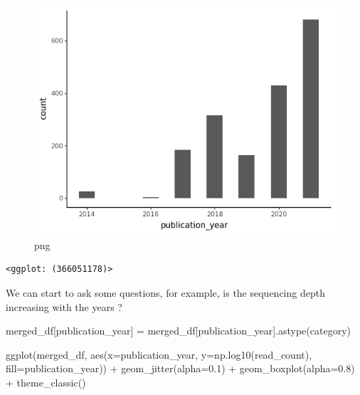 \documentclass[
  letterpaper,
]{book}
\newenvironment{Shaded}{}{}
\newcommand{\FloatTok}[1]{\textcolor[rgb]{0.00,0.36,0.77}{#1}}
\newcommand{\NormalTok}[1]{\textcolor[rgb]{0.14,0.16,0.18}{#1}}
\newcommand{\OperatorTok}[1]{\textcolor[rgb]{0.14,0.16,0.18}{#1}}
\newcommand{\StringTok}[1]{\textcolor[rgb]{0.01,0.18,0.38}{#1}}
\begin{document}
\begin{figure}

{\centering \includegraphics{assets/images/chapters/introduction-to-python/tutorial_111_1.png}

}

\caption{png}

\end{figure}

\begin{verbatim}
<ggplot: (366051178)>
\end{verbatim}

We can start to ask some questions, for example, is the sequencing depth
increasing with the years ?

\begin{Shaded}
\begin{Highlighting}[]
\NormalTok{merged\_df[}\StringTok{\textquotesingle{}publication\_year\textquotesingle{}}\NormalTok{] }\OperatorTok{=}\NormalTok{ merged\_df[}\StringTok{\textquotesingle{}publication\_year\textquotesingle{}}\NormalTok{].astype(}\StringTok{\textquotesingle{}category\textquotesingle{}}\NormalTok{)}
\end{Highlighting}
\end{Shaded}

\begin{Shaded}
\begin{Highlighting}[]
\NormalTok{ggplot(merged\_df, aes(x}\OperatorTok{=}\StringTok{\textquotesingle{}publication\_year\textquotesingle{}}\NormalTok{, y}\OperatorTok{=}\StringTok{\textquotesingle{}np.log10(read\_count)\textquotesingle{}}\NormalTok{, fill}\OperatorTok{=}\StringTok{\textquotesingle{}publication\_year\textquotesingle{}}\NormalTok{)) }\OperatorTok{+}
\NormalTok{geom\_jitter(alpha}\OperatorTok{=}\FloatTok{0.1}\NormalTok{) }\OperatorTok{+}\NormalTok{ geom\_boxplot(alpha}\OperatorTok{=}\FloatTok{0.8}\NormalTok{) }\OperatorTok{+}\NormalTok{ theme\_classic()}
\end{Highlighting}
\end{Shaded}
\end{document}
